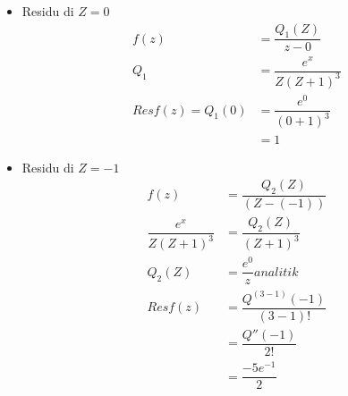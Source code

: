 \documentclass{article}
\begin{document}
\begin{itemize}
    \item   Residu di $Z=0$ \\
          \begin{align}
              f(z)              & = \dfrac{Q_1(Z)}{z-0}
              \nonumber                                   \\
              Q_1               & = \dfrac{e^x}{Z(Z+1)^3}
              \nonumber                                   \\
              Res f(z) = Q_1(0) & = \dfrac{e^0}{(0+1)^3}
              \nonumber                                   \\
                                & = 1
              \nonumber
          \end{align}
    \item   Residu di $Z=-1$ \\
          \begin{align}
              f(z)                  & = \dfrac{Q_2(Z)}{(Z-(-1))}
              \nonumber                                               \\
              \dfrac{e^x}{Z(Z+1)^3} & = \dfrac{Q_2(Z)}{(Z+1)^3}
              \nonumber                                               \\
              Q_2(Z)                & = \dfrac{e^0}{z} analitik
              \nonumber                                               \\
              Res f(z)              & = \dfrac{Q^{(3-1)}(-1)}{(3-1)!}
              \nonumber                                               \\
                                    & = \dfrac{Q''(-1)}{2!}
              \nonumber                                               \\
                                    & = \dfrac{-5e^{-1}}{2}
              \nonumber
          \end{align}
\end{itemize}
\end{document}
